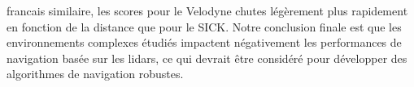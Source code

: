 \begin{otherlanguage*}{francais}
similaire, les scores pour le Velodyne chutes légèrement plus rapidement en fonction de la distance que pour le SICK. Notre conclusion finale est que les environnements complexes étudiés impactent négativement les performances de navigation basée sur les \gls*{lidar}s, ce qui devrait être considéré pour développer des algorithmes de navigation robustes.


\end{otherlanguage*}
